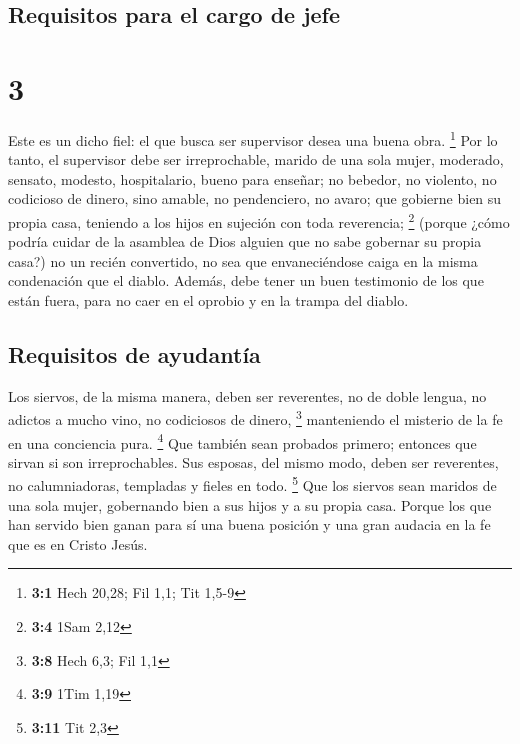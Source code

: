 \begin{paracol}{2}
{\subsection{Requisitos para el cargo de
jefe}\label{requisitos-para-el-cargo-de-jefe}}

\hypertarget{section-4}{%
\section{3}\label{section-4}}

 Este es un dicho fiel: el que busca ser supervisor desea
una buena obra. \footnote{\textbf{3:1} Hech 20,28; Fil 1,1; Tit 1,5-9}
 Por lo tanto, el supervisor debe ser irreprochable,
marido de una sola mujer, moderado, sensato, modesto, hospitalario,
bueno para enseñar;  no bebedor, no violento, no codicioso
de dinero, sino amable, no pendenciero, no avaro;  que
gobierne bien su propia casa, teniendo a los hijos en sujeción con toda
reverencia; \footnote{\textbf{3:4} 1Sam 2,12}  (porque
¿cómo podría cuidar de la asamblea de Dios alguien que no sabe gobernar
su propia casa?)  no un recién convertido, no sea que
envaneciéndose caiga en la misma condenación que el diablo.
 Además, debe tener un buen testimonio de los que están
fuera, para no caer en el oprobio y en la trampa del diablo.

\hypertarget{requisitos-de-ayudantuxeda}{%
\subsection{Requisitos de ayudantía}\label{requisitos-de-ayudantuxeda}}

 Los siervos, de la misma manera, deben ser reverentes, no
de doble lengua, no adictos a mucho vino, no codiciosos de dinero,
\footnote{\textbf{3:8} Hech 6,3; Fil 1,1}  manteniendo el
misterio de la fe en una conciencia pura. \footnote{\textbf{3:9} 1Tim
  1,19}  Que también sean probados primero; entonces que
sirvan si son irreprochables.  Sus esposas, del mismo
modo, deben ser reverentes, no calumniadoras, templadas y fieles en
todo. \footnote{\textbf{3:11} Tit 2,3}  Que los siervos
sean maridos de una sola mujer, gobernando bien a sus hijos y a su
propia casa.  Porque los que han servido bien ganan para
sí una buena posición y una gran audacia en la fe que es en Cristo
Jesús.


\end{paracol}
